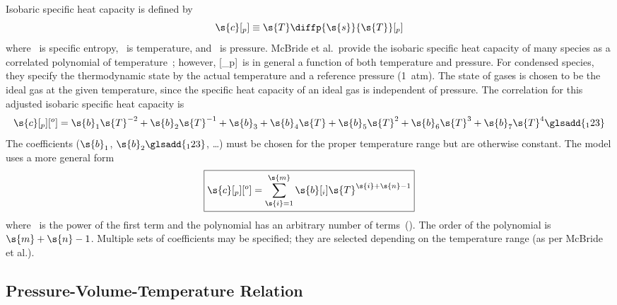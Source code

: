 Isobaric specific heat capacity is defined by
\begin{equation}
  \label{eq:cpDefinition}
  \s{c}[_p] \equiv \s{T}\diffp{\s{s}}{\s{T}}[_p]
\end{equation}
where ~is specific entropy, ~is temperature, and ~is pressure.  McBride et al.\ provide the isobaric specific heat capacity of many species as a correlated polynomial of temperature~\cite{McBride2002}; however, [_p]~is in general a function of both temperature and pressure.  For condensed species, they specify the thermodynamic state by the actual temperature and a reference pressure (\SI{1}{atm}).  The state of gases is chosen to be the ideal gas at the given temperature, since the specific heat capacity of an ideal gas is independent of pressure.  The correlation for this adjusted isobaric specific heat capacity is
\begin{equation}
  \label{eq:cpo}
  \s{c}[_p][^o] = \s{b}_1\s{T}^{-2} + \s{b}_2\s{T}^{-1} + \s{b}_3 + \s{b}_4\s{T} + \s{b}_5\s{T}^2 + \s{b}_6\s{T}^3 + \s{b}_7\s{T}^4
  \glsadd{_123}
\end{equation}
The coefficients ($\s{b}_1$, $\s{b}_2\glsadd{_123}$, \dots) must be chosen for the proper temperature range but are otherwise constant.  The model uses a more general form
\begin{equation}
  \boxed{\s{c}[_p][^o] = \sum_{\s{i} = 1}^{\s{m}}\s{b}[_i]\s{T}^{\s{i} + \s{n} - 1}}
\end{equation}
where ~is the power of the first term and the polynomial has an arbitrary number of terms~().  The order of the polynomial is $\s{m} + \s{n} - 1$.  Multiple sets of coefficients may be specified; they are selected depending on the temperature range (as per McBride et al.).


\subsection{Pressure-Volume-Temperature Relation}


